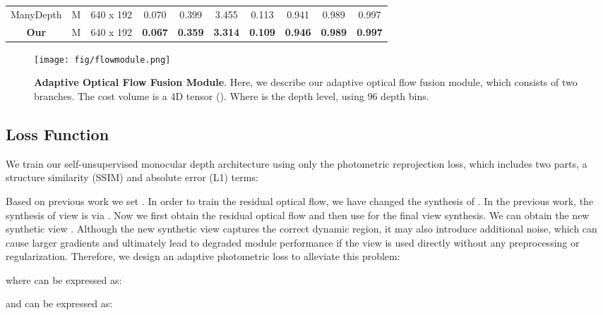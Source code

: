 \documentclass[journal]{IEEEtran}
\begin{document}
\begin{table*}
\begin{tabular}{cccccccccc}
ManyDepth \cite{manydepth}         & M                         & 640 x 192            & \multicolumn{1}{c}{0.070}   & \multicolumn{1}{c}{0.399}  & \multicolumn{1}{c}{3.455} & 0.113    & \multicolumn{1}{c}{0.941}           & \multicolumn{1}{c}{0.989}             & 0.997             \\
\textbf{Our}                        & M                         & 640 x 192            & \multicolumn{1}{c}{\textbf{0.067}}   & \multicolumn{1}{c}{\textbf{0.359}}  & \multicolumn{1}{c}{\textbf{3.314}} & \textbf{0.109}    & \multicolumn{1}{c}{\textbf{0.946}}           & \multicolumn{1}{c}{\textbf{0.989}}             & \textbf{0.997}           \\ \bottomrule[1pt]
\end{tabular}
\end{table*}

\begin{figure}[!ht]
\centering
\texttt{[image: fig/flowmodule.png]}
\caption{\textbf{Adaptive Optical Flow Fusion Module}. 
Here, we describe our adaptive optical flow fusion module, which consists of two branches. The cost volume is a 4D tensor (). Where  is the depth level, using 96 depth bins.}
\label{fig:flowmodule}
\end{figure}

\subsection{Loss Function}
We train our self-unsupervised monocular depth architecture using only the photometric reprojection loss, which includes two parts, a structure similarity (SSIM) \cite{wang2004image} and absolute error (L1) terms:


Based on previous work we set . In order to train the residual optical flow, we have changed the synthesis of . In the previous work, the synthesis of view is via . Now we first obtain the residual optical flow and then use  for the final view synthesis. We can obtain the new synthetic view . Although the new synthetic view captures the correct dynamic region, it may also introduce additional noise, which can cause larger gradients and ultimately lead to degraded module performance if the view is used directly without any preprocessing or regularization. Therefore, we design an adaptive photometric loss to alleviate this problem:

where  can be expressed as:

and  can be expressed as:
\end{document}
